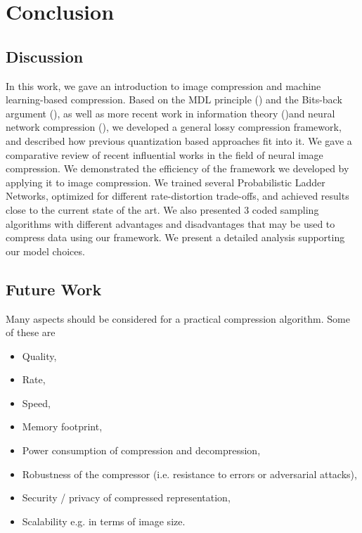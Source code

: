 
\chapter{Conclusion}

\section{Discussion}
\par
In this work, we gave an introduction to image compression and machine
learning-based compression. Based on the MDL principle (\cite{rissanen1986stochastic})
and the Bits-back argument (\cite{hinton1993keeping}), as
well as more recent work in information theory
(\cite{harsha2007communication})and neural network compression
(\cite{havasi2018minimal}),
we developed a general lossy compression framework, and described how previous
quantization based approaches fit into it. We gave a comparative review of
recent influential works in the field of neural image compression. We
demonstrated the efficiency of the framework we developed by applying it to
image compression. We trained several Probabilistic Ladder Networks, optimized
for different rate-distortion trade-offs, and achieved results close to
the current state of the art. We also presented 3 coded sampling algorithms with
different advantages and disadvantages that may be used to compress data using
our framework. We present a detailed analysis supporting our model choices.

\section{Future Work}
\par 
Many aspects should be considered for a practical compression
algorithm. Some of these are
\begin{itemize}
\item Quality,
\item Rate,
\item Speed,
\item Memory footprint,
\item Power consumption of compression and decompression,
\item Robustness of the compressor (i.e. resistance to errors or adversarial attacks),
\item Security / privacy of compressed representation,
\item Scalability e.g. in terms of image size.
\end{itemize}

